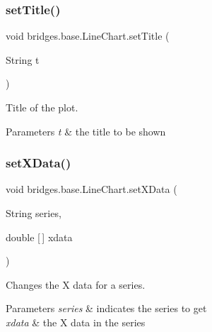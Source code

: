 \subsubsection{\texorpdfstring{set\+Title()}{setTitle()}}
{\footnotesize\ttfamily void bridges.\+base.\+Line\+Chart.\+set\+Title (\begin{DoxyParamCaption}\item[{String}]{t }\end{DoxyParamCaption})}



Title of the plot. 


\begin{DoxyParams}{Parameters}
{\em t} & the title to be shown \\
\hline
\end{DoxyParams}
\mbox{\label{classbridges_1_1base_1_1_line_chart_a2918179283e8280d47abb43df3c59195}} 
\subsubsection{\texorpdfstring{set\+X\+Data()}{setXData()}\hspace{0.1cm}{\footnotesize\ttfamily [1/2]}}
{\footnotesize\ttfamily void bridges.\+base.\+Line\+Chart.\+set\+X\+Data (\begin{DoxyParamCaption}\item[{String}]{series,  }\item[{double \mbox{[}$\,$\mbox{]}}]{xdata }\end{DoxyParamCaption})}



Changes the X data for a series. 


\begin{DoxyParams}{Parameters}
{\em series} & indicates the series to get \\
\hline
{\em xdata} & the X data in the series \\
\hline
\end{DoxyParams}
\mbox{\label{classbridges_1_1base_1_1_line_chart_a2f141ec46fdafd92fb0d86900a2de46a}} 
